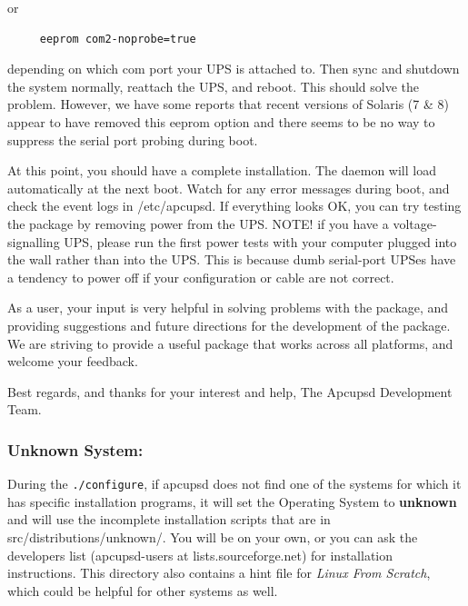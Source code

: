 or 

\footnotesize
\begin{verbatim}
     eeprom com2-noprobe=true
\end{verbatim}
\normalsize

depending on which com port your UPS is attached to. Then sync and shutdown
the system normally, reattach the UPS, and reboot. This should solve the
problem. However, we have some reports that recent versions of Solaris (7 \&
8) appear to have removed this eeprom option and there seems to be no way to
suppress the serial port probing during boot.  

At this point, you should have a complete installation. The daemon will load
automatically at the next boot. Watch for any error messages during boot, and
check the event logs in /etc/apcupsd. If everything looks OK, you can try
testing the package by removing power from the UPS. NOTE! if you have a
voltage-signalling UPS, please run the first power tests with your computer
plugged into the wall rather than into the UPS. This is because dumb
serial-port UPSes have a tendency to power off if your configuration or cable
are not correct.  

As a user, your input is very helpful in solving problems with the package,
and providing suggestions and future directions for the development of the
package. We are striving to provide a useful package that works across all
platforms, and welcome your feedback.  

Best regards, and thanks for your interest and help, The Apcupsd Development
Team. 

\label{Unknown-System}

\subsubsection*{Unknown System:}

\label{index-Unknown-System-53}
\label{index-OS_002c-Unknown-System-54}
During the {\tt ./configure}, if apcupsd does not find one of the systems for
which it has specific installation programs, it will set the Operating System
to {\bf unknown} and will use the incomplete installation scripts that are in
\lt{}src\gt{}/distributions/unknown/. You will be on your own, or you can ask
the developers list (apcupsd-users at lists.sourceforge.net) for installation
instructions. This directory also contains a hint file for {\it Linux From
Scratch}, which could be helpful for other systems as well. 

\label{Windows-Systems}
